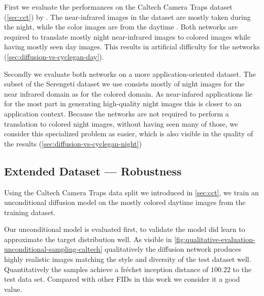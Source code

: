 First we evaluate the performances on the Caltech Camera Traps dataset (\autoref{sec:cct}) by .
The near-infrared images in the dataset are mostly taken during the night, while the color images are from the daytime \parencite{caltech}.
Both networks are required to translate mostly night near-infrared images to colored images while having mostly seen day images.
This results in artificial difficulty for the networks (\autoref{sec:diffusion-vs-cyclegan-day}).

Secondly we evaluate both networks on a more application-oriented dataset.
The subset of the Serengeti dataset we use consists mostly of night images for the near infrared domain as for the colored domain.
As near-infared applications lie for the most part in generating high-quality night images this is closer to an application context.
Because the networks are not required to perform a translation to colored night images, without having seen many of those, we consider
this specialized problem as easier, which is also visible in the quality of the results (\autoref{sec:diffusion-vs-cyclegan-night})

\subsection{Extended Dataset --- Robustness}
\label{sec:diffusion-vs-cyclegan-day}
Using the Caltech Camera Traps data split we introduced in \autoref{sec:cct},
we train an unconditional diffusion model on the mostly colored daytime images from the training dataset.

Our unconditional model is evaluated first, to validate the model did learn to approximate the target distribution well.
As visible in \autoref{fig:qualitative-evaluation-unconditional-sampling-caltech} qualitatively the diffusion network
produces highly realistic images matching the style and diversity of the test dataset well.
Quantitatively the samples achieve a fréchet inception distance of $100.22$ to the test data set.
Compared with other FIDs in this work we consider it a good value.

